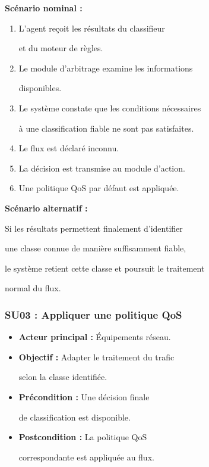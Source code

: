 \textbf{Scénario nominal :}

\begin{enumerate}

    \item L'agent reçoit les résultats du classifieur

    et du moteur de règles.

    \item Le module d'arbitrage examine les informations

    disponibles.

    \item Le système constate que les conditions nécessaires

    à une classification fiable ne sont pas satisfaites.

    \item Le flux est déclaré inconnu.

    \item La décision est transmise au module d'action.

    \item Une politique QoS par défaut est appliquée.

\end{enumerate}



\textbf{Scénario alternatif :}

Si les résultats permettent finalement d'identifier

une classe connue de manière suffisamment fiable,

le système retient cette classe et poursuit le traitement

normal du flux.





\subsubsection{SU03 : Appliquer une politique QoS}



\begin{itemize}

    \item \textbf{Acteur principal :} Équipements réseau.

    \item \textbf{Objectif :} Adapter le traitement du trafic

    selon la classe identifiée.

    \item \textbf{Précondition :} Une décision finale

    de classification est disponible.

    \item \textbf{Postcondition :} La politique QoS

    correspondante est appliquée au flux.

\end{itemize}



